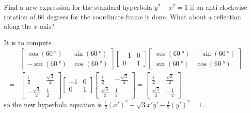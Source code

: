 \begin{Exercise}
Find a new expression for the standard hyperbola $y^2 - x^2 = 1$ if an anti-clockwise rotation of $60$ degrees for the coordinate frame is done. What about a reflection along the $x$-axis?
\end{Exercise}
\begin{Answer}
It is to compute
\begin{align*}
& \begin{bmatrix}
\cos (\SI{60}{\degree}) & \sin (\SI{60}{\degree}) \\
-\sin (\SI{60}{\degree}) & \cos (\SI{60}{\degree})
\end{bmatrix}
\begin{bmatrix}
-1 & 0 \\
0 & 1
\end{bmatrix}
\begin{bmatrix}
\cos (\SI{60}{\degree}) & -\sin (\SI{60}{\degree}) \\
\sin (\SI{60}{\degree}) & \cos (\SI{60}{\degree})
\end{bmatrix} \\
=& \begin{bmatrix}
\frac{1}{2} & \frac{\sqrt{3}}{2} \\
-\frac{\sqrt{3}}{2}  & \frac{1}{2}
\end{bmatrix}
\begin{bmatrix}
-1 & 0 \\
0 & 1
\end{bmatrix}
\begin{bmatrix}
\frac{1}{2} & -\frac{\sqrt{3}}{2}  \\
\frac{\sqrt{3}}{2}  & \frac{1}{2}
\end{bmatrix}
=
\begin{bmatrix}
\frac{1}{2}&\frac{\sqrt{3}}{2}\\ 
\frac{\sqrt{3}}{2}&-\frac{1}{2}
\end{bmatrix}
\end{align*}
so the new hyperbola equation is $\frac{1}{2}(x')^2+ \sqrt{3}x'y' -\frac{1}{2}(y')^2 = 1$.
\end{Answer}

